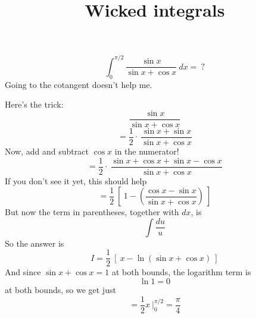 \documentclass[11pt, oneside]{article}   	%
\title{Wicked integrals}
\date{}							%
\begin{document}
\maketitle
\Large
\[ \int_0^{\pi/2} \frac{\sin x}{\sin x + \cos x} \ dx = \ ? \]
Going to the cotangent doesn't help me.

Here's the trick:
\[ \frac{\sin x}{\sin x + \cos x} \]
\[ = \frac{1}{2} \cdot\ \frac{\sin x + \sin x}{\sin x + \cos x} \]
Now, add and subtract $\cos x$ in the numerator!
\[ = \frac{1}{2} \cdot\ \frac{\sin x + \cos x + \sin x - \cos x}{\sin x + \cos x} \]
If you don't see it yet, this should help
\[ = \frac{1}{2} \ [ \ 1 - (\frac{\cos x - \sin x}{\sin x + \cos x}) \ ] \]
But now the term in parentheses, together with $dx$, is
\[ \int \frac{du}{u} \]
So the answer is
\[ I = \frac{1}{2} \ [ \ x - \ln (\sin x + \cos x) \ ] \]
And since $\sin x + \cos x = 1$ at both bounds, the logarithm term is 
\[ \ln 1 = 0 \]
at both bounds, so we get just
\[ = \frac{1}{2} x \ \bigg |_0^{\pi/2} = \frac{\pi}{4} \]
\end{document}
